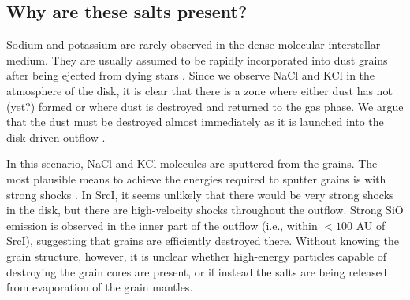\documentclass[twocolumn]{aastex62}
\newcommand{\sourcei}{SrcI\xspace}
\begin{document}
\subsection{Why are these salts present?}

Sodium and potassium are rarely observed in the dense molecular interstellar
medium.  They are usually assumed to be rapidly incorporated into dust grains
after being ejected from dying stars \citep[e.g.,][]{Milam2007a}.  Since we
observe NaCl and KCl in the atmosphere of the disk, it is clear that
there is a zone where either dust has not (yet?) formed or
where dust is destroyed and returned to the gas phase.  We argue that the dust
must be destroyed almost immediately as it is launched into the disk-driven
outflow \citep{Hirota2017a}.







In this scenario,  NaCl and KCl molecules are sputtered from the grains.  The
most plausible means to achieve the energies required to sputter grains is with
strong shocks \citep{Schilke1997a}.  In
\sourcei, it seems unlikely that there would be very strong shocks in the disk,
but there are high-velocity shocks throughout the outflow. Strong SiO emission
is observed in the inner part of the outflow (i.e., within $<100$ AU of
\sourcei), suggesting that grains are efficiently destroyed there.
Without knowing the grain structure, however, it is unclear whether high-energy
particles capable of destroying the grain cores are present, or if instead
the salts are being released from evaporation of the grain mantles.
\end{document}
